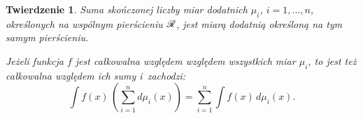 \documentclass[a4paper,11pt]{article}
\newtheorem{theorem}{Twierdzenie} %
\begin{document}
\begin{theorem}

  Suma skończonej liczby miar dodatnich $\mu_{ i }$, $i = 1, \ldots, n$,
  określonych na wspólnym pierścieniu $\mathcal{R}$, jest miarą dodatnią
  określoną na tym samym pierścieniu.

  Jeżeli funkcja $f$ jest całkowalna względem względem wszystkich miar
  $\mu_{ i }$, to jest też całkowalna względem ich sumy i~zachodzi:
  \begin{equation}
    \label{eq:RS-Vol-I-s01-02}
    \int f( x ) \, \left( \sum\limits_{ i = 1 }^{ n } d\mu_{ i }( x ) \right)
    = \sum\limits_{ i = 1 }^{ n } \int f( x ) \, d\mu_{ i }( x ).
  \end{equation}

\end{theorem}
\end{document}
